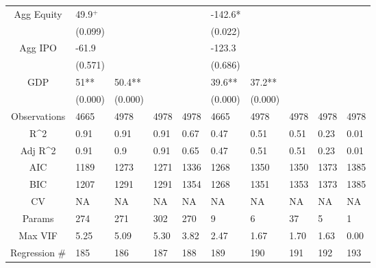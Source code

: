 \documentclass{article}
\begin{document}
\begin{table}[H]
\begin{tabular}{|clllllllll|}
  Agg Equity & 49.9$^{+}$ &  &  &  & -142.6* &  &  &  &  \\ 
   & (0.099) &  &  &  & (0.022) &  &  &  &  \\ 
  Agg IPO & -61.9 &  &  &  & -123.3 &  &  &  &  \\ 
   & (0.571) &  &  &  & (0.686) &  &  &  &  \\ 
  GDP & 51** & 50.4** &  &  & 39.6** & 37.2** &  &  &  \\ 
   & (0.000) & (0.000) &  &  & (0.000) & (0.000) &  &  &  \\ 
  \hline 
 Observations & 4665 & 4978 & 4978 & 4978 & 4665 & 4978 & 4978 & 4978 & 4978 \\ 
  R^2 & 0.91 & 0.91 & 0.91 & 0.67 & 0.47 & 0.51 & 0.51 & 0.23 & 0.01 \\ 
  Adj R^2 & 0.91 & 0.9 & 0.91 & 0.65 & 0.47 & 0.51 & 0.51 & 0.23 & 0.01 \\ 
  AIC & 1189 & 1273 & 1271 & 1336 & 1268 & 1350 & 1350 & 1373 & 1385 \\ 
  BIC & 1207 & 1291 & 1291 & 1354 & 1268 & 1351 & 1353 & 1373 & 1385 \\ 
  CV & NA & NA & NA & NA & NA & NA & NA & NA & NA \\ 
  Params & 274 & 271 & 302 & 270 & 9 & 6 & 37 & 5 & 1 \\ 
  Max VIF & 5.25 & 5.09 & 5.30 & 3.82 & 2.47 & 1.67 & 1.70 & 1.63 & 0.00 \\ 
  Regression \# & 185 & 186 & 187 & 188 & 189 & 190 & 191 & 192 & 193 \\ 
   \hline
\end{tabular}
 
\end{table}
\end{document}
